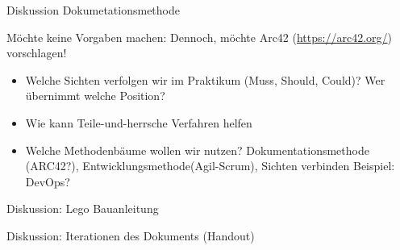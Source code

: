 \documentclass{beamer}
\begin{document}
\begin{frame}{Diskussion Dokumetationsmethode}

  Möchte keine Vorgaben machen: Dennoch, möchte Arc42 (\url{https://arc42.org/}) vorschlagen!

    \begin{itemize}
        \item Welche Sichten verfolgen wir im Praktikum (Muss, Should, Could)? Wer übernimmt welche Position?
        \item Wie kann Teile-und-herrsche Verfahren helfen
        \item Welche Methodenbäume wollen wir nutzen? Dokumentationsmethode (ARC42?), Entwicklungsmethode(Agil-Scrum), Sichten verbinden Beispiel: DevOps?
    \end{itemize}
    Diskussion: Lego Bauanleitung

    Diskussion: Iterationen des Dokuments (Handout)
\end{frame}
\end{document}
